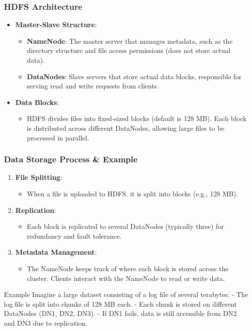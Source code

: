 \documentclass[aspectratio=169]{beamer}
\begin{document}
\begin{frame}[fragile]
    \frametitle{HDFS Architecture}
    \begin{itemize}
        \item \textbf{Master-Slave Structure}:
        \begin{itemize}
            \item \textbf{NameNode}: The master server that manages metadata, such as the directory structure and file access permissions (does not store actual data).
            \item \textbf{DataNodes}: Slave servers that store actual data blocks, responsible for serving read and write requests from clients.
        \end{itemize}
        
        \item \textbf{Data Blocks}:
        \begin{itemize}
            \item HDFS divides files into fixed-sized blocks (default is 128 MB). Each block is distributed across different DataNodes, allowing large files to be processed in parallel.
        \end{itemize}
    \end{itemize}
\end{frame}

\begin{frame}[fragile]
    \frametitle{Data Storage Process & Example}
    \begin{enumerate}
        \item \textbf{File Splitting}:
        \begin{itemize}
            \item When a file is uploaded to HDFS, it is split into blocks (e.g., 128 MB).
        \end{itemize}
        
        \item \textbf{Replication}:
        \begin{itemize}
            \item Each block is replicated to several DataNodes (typically three) for redundancy and fault tolerance.
        \end{itemize}

        \item \textbf{Metadata Management}:
        \begin{itemize}
            \item The NameNode keeps track of where each block is stored across the cluster. Clients interact with the NameNode to read or write data.
        \end{itemize}
    \end{enumerate}

    \begin{block}{Example}
        Imagine a large dataset consisting of a log file of several terabytes:
        - The log file is split into chunks of 128 MB each.
        - Each chunk is stored on different DataNodes (DN1, DN2, DN3).
        - If DN1 fails, data is still accessible from DN2 and DN3 due to replication.
    \end{block}
\end{frame}
\end{document}
